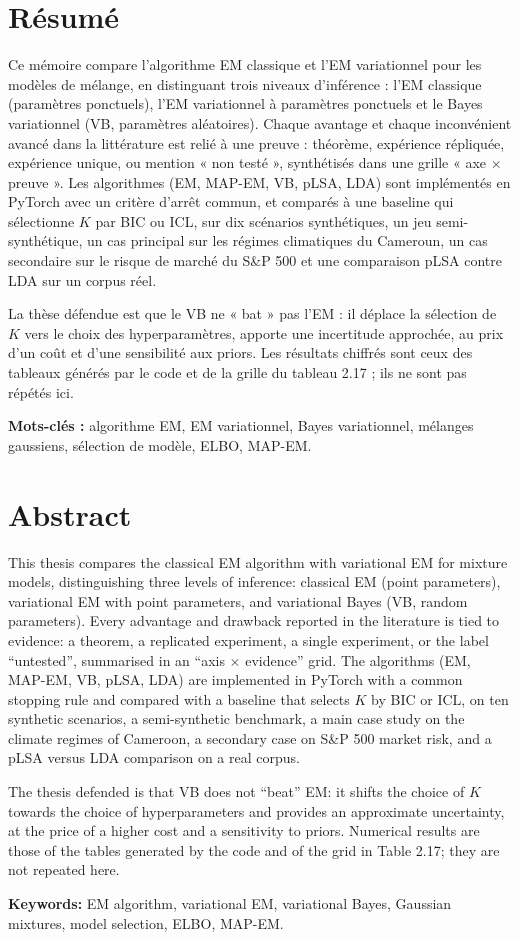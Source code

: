 \chapter*{Résumé}
Ce mémoire compare l'algorithme EM classique et l'EM variationnel pour les modèles de mélange, en distinguant trois niveaux d'inférence : l'EM classique (paramètres ponctuels), l'EM variationnel à paramètres ponctuels et le Bayes variationnel (VB, paramètres aléatoires). Chaque avantage et chaque inconvénient avancé dans la littérature est relié à une preuve : théorème, expérience répliquée, expérience unique, ou mention « non testé », synthétisés dans une grille « axe $\times$ preuve ». Les algorithmes (EM, MAP-EM, VB, pLSA, LDA) sont implémentés en PyTorch avec un critère d'arrêt commun, et comparés à une baseline qui sélectionne $K$ par BIC ou ICL, sur dix scénarios synthétiques, un jeu semi-synthétique, un cas principal sur les régimes climatiques du Cameroun, un cas secondaire sur le risque de marché du S\&P 500 et une comparaison pLSA contre LDA sur un corpus réel.

La thèse défendue est que le VB ne « bat » pas l'EM : il déplace la sélection de $K$ vers le choix des hyperparamètres, apporte une incertitude approchée, au prix d'un coût et d'une sensibilité aux priors. Les résultats chiffrés sont ceux des tableaux générés par le code et de la grille du tableau 2.17 ; ils ne sont pas répétés ici.

\textbf{Mots-clés : }algorithme EM, EM variationnel, Bayes variationnel, mélanges gaussiens, sélection de modèle, ELBO, MAP-EM.

\chapter*{Abstract}
This thesis compares the classical EM algorithm with variational EM for mixture models, distinguishing three levels of inference: classical EM (point parameters), variational EM with point parameters, and variational Bayes (VB, random parameters). Every advantage and drawback reported in the literature is tied to evidence: a theorem, a replicated experiment, a single experiment, or the label ``untested'', summarised in an ``axis $\times$ evidence'' grid. The algorithms (EM, MAP-EM, VB, pLSA, LDA) are implemented in PyTorch with a common stopping rule and compared with a baseline that selects $K$ by BIC or ICL, on ten synthetic scenarios, a semi-synthetic benchmark, a main case study on the climate regimes of Cameroon, a secondary case on S\&P 500 market risk, and a pLSA versus LDA comparison on a real corpus.

The thesis defended is that VB does not ``beat'' EM: it shifts the choice of $K$ towards the choice of hyperparameters and provides an approximate uncertainty, at the price of a higher cost and a sensitivity to priors. Numerical results are those of the tables generated by the code and of the grid in Table 2.17; they are not repeated here.

\textbf{Keywords: }EM algorithm, variational EM, variational Bayes, Gaussian mixtures, model selection, ELBO, MAP-EM.
